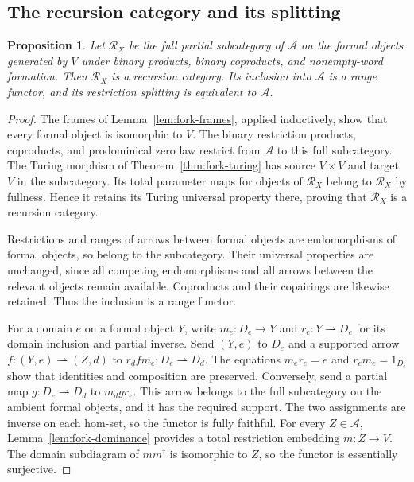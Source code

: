\documentclass[11pt]{article}
\newtheorem{proposition}[theorem]{Proposition}
\begin{document}
\subsection{The recursion category and its splitting}

\begin{proposition}\label{prop:fork-recursion}
Let $\mathscr R_X$ be the full partial subcategory of
$\mathcal A$ on the formal objects generated by $V$ under
binary products, binary coproducts, and nonempty-word formation.
Then $\mathscr R_X$ is a recursion category. Its inclusion
into $\mathcal A$ is a range functor, and its restriction
splitting is equivalent to $\mathcal A$.
\end{proposition}
\begin{proof}
The frames of Lemma~\ref{lem:fork-frames}, applied inductively,
show that every formal object is isomorphic to $V$.
The binary restriction products, coproducts, and prodominical
zero law restrict from $\mathcal A$ to this full subcategory.
The Turing morphism of Theorem~\ref{thm:fork-turing} has
source $V\times V$ and target $V$ in the subcategory.
Its total parameter maps for objects of $\mathscr R_X$ belong
to $\mathscr R_X$ by fullness. Hence it retains its Turing
universal property there, proving that $\mathscr R_X$ is a
recursion category.

Restrictions and ranges of arrows between formal objects are
endomorphisms of formal objects, so belong to the subcategory.
Their universal properties are unchanged, since all competing
endomorphisms and all arrows between the relevant objects remain
available. Coproducts and their copairings are likewise retained.
Thus the inclusion is a range functor.

For a domain $e$ on a formal object $Y$, write
$m_e:D_e\to Y$ and $r_e:Y\rightharpoonup D_e$ for its
domain inclusion and partial inverse. Send $(Y,e)$ to $D_e$
and a supported arrow $f:(Y,e)\rightharpoonup(Z,d)$ to
$r_d f m_e:D_e\rightharpoonup D_d$.
The equations $m_er_e=e$ and $r_em_e=1_{D_e}$ show that
identities and composition are preserved. Conversely, send a
partial map $g:D_e\rightharpoonup D_d$ to $m_d g r_e$.
This arrow belongs to the full subcategory on the ambient
formal objects, and it has the required support. The two
assignments are inverse on each hom-set, so the functor is
fully faithful.
For every $Z\in\mathcal A$, Lemma~\ref{lem:fork-dominance}
provides a total restriction embedding $m:Z\to V$.
The domain subdiagram of $mm^\dagger$ is isomorphic to $Z$,
so the functor is essentially surjective.
\end{proof}
\end{document}
